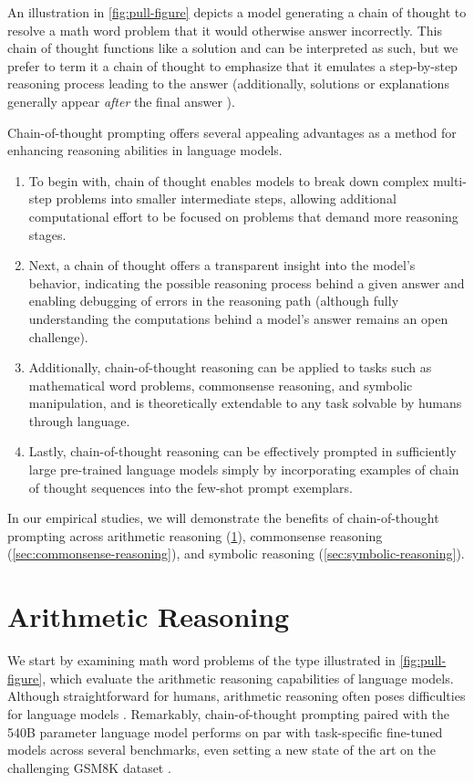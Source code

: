 An illustration in \cref{fig:pull-figure} depicts a model generating a chain of thought to resolve a math word problem that it would otherwise answer incorrectly. This chain of thought functions like a solution and can be interpreted as such, but we prefer to term it a chain of thought to emphasize that it emulates a step-by-step reasoning process leading to the answer (additionally, solutions or explanations generally appear \textit{after} the final answer \citep[][\textit{inter alia}]{narang2020wt5,wiegreffe2021reframing,lampinen2022can}).

Chain-of-thought prompting offers several appealing advantages as a method for enhancing reasoning abilities in language models.

\begin{enumerate}[topsep=1pt,itemsep=0ex]
    \item To begin with, chain of thought enables models to break down complex multi-step problems into smaller intermediate steps, allowing additional computational effort to be focused on problems that demand more reasoning stages.
    \item Next, a chain of thought offers a transparent insight into the model’s behavior, indicating the possible reasoning process behind a given answer and enabling debugging of errors in the reasoning path (although fully understanding the computations behind a model’s answer remains an open challenge).
    \item Additionally, chain-of-thought reasoning can be applied to tasks such as mathematical word problems, commonsense reasoning, and symbolic manipulation, and is theoretically extendable to any task solvable by humans through language.
    \item Lastly, chain-of-thought reasoning can be effectively prompted in sufficiently large pre-trained language models simply by incorporating examples of chain of thought sequences into the few-shot prompt exemplars.
\end{enumerate}

In our empirical studies, we will demonstrate the benefits of chain-of-thought prompting across arithmetic reasoning (\cref{sec:arithmetic-reasoning}), commonsense reasoning (\cref{sec:commonsense-reasoning}), and symbolic reasoning (\cref{sec:symbolic-reasoning}).

\section{Arithmetic Reasoning}\label{sec:arithmetic-reasoning}
We start by examining math word problems of the type illustrated in \cref{fig:pull-figure}, which evaluate the arithmetic reasoning capabilities of language models. Although straightforward for humans, arithmetic reasoning often poses difficulties for language models \citep[][\textit{inter alia}]{hendrycks2021measuring,patel-etal-2021-nlp}. Remarkably, chain-of-thought prompting paired with the 540B parameter language model performs on par with task-specific fine-tuned models across several benchmarks, even setting a new state of the art on the challenging GSM8K dataset \citep{cobbe2021training}.

